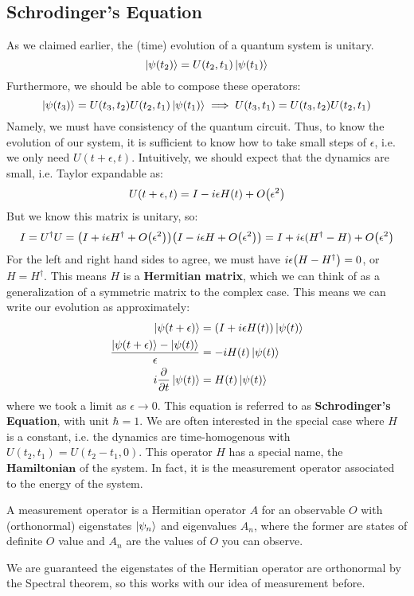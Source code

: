\subsection{Schrodinger's Equation}
As we claimed earlier, the (time) evolution of a quantum system is unitary.
\[ \ket{\psi(t_2)} = U(t_2, t_1) \ket{\psi(t_1)} \]
Furthermore, we should be able to compose these operators:
\[ \ket{\psi(t_3)} = U(t_3, t_2) U(t_2, t_1) \ket{\psi(t_1)} \implies U(t_3, t_1) = U(t_3, t_2) U(t_2, t_1) \]
Namely, we must have consistency of the quantum circuit. Thus, to know the evolution of our system, it is sufficient to know
how to take small steps of $\epsilon$, i.e. we only need $U(t + \epsilon, t)$. Intuitively, we should expect that the dynamics are small, i.e.
Taylor expandable as:
\[ U(t + \epsilon, t) = I - i\epsilon H(t) + O\qty(\epsilon^2) \]
But we know this matrix is unitary, so:
\[ I = U^{\dagger} U = \qty(I + i\epsilon H^{\dagger} + O\qty(\epsilon^2))\qty(I - i \epsilon H + O\qty(\epsilon^2)) = I + i \epsilon (H^{\dagger} - H) + O\qty(\epsilon^2) \]
For the left and right hand sides to agree, we must have $ i \epsilon \qty(H - H^{\dagger}) = 0$, or $H = H^{\dagger}$. This means $H$ is a \textbf{Hermitian matrix}, which
we can think of as a generalization of a symmetric matrix to the complex case. This means we can write our evolution as approximately:
\begin{align*}
    \ket{\psi(t + \epsilon)} &= (I + i\epsilon H(t)) \ket{\psi(t)} \\
    \frac{\ket{\psi(t + \epsilon)} - \ket{\psi(t)}}{\epsilon} &= - i H(t) \ket{\psi(t)} \\
    i \pdv{}{t} \ket{\psi(t)} &= H(t) \ket{\psi(t)}
\end{align*}
where we took a limit as $\epsilon \to 0$. This equation is referred to as \textbf{Schrodinger's Equation}, with unit $\hbar = 1$. We are often
interested in the special case where $H$ is a constant, i.e. the dynamics are time-homogenous with $U(t_2, t_1) = U(t_2 - t_1, 0)$.
This operator $H$ has a special name, the $\textbf{Hamiltonian}$ of the system. In fact, it is the measurement operator associated to the energy of the system.
\begin{definition}
    A measurement operator is a Hermitian operator $A$ for an observable $O$ %
    with (orthonormal) eigenstates $\ket{\psi_n}$ and eigenvalues $A_n$, where the former are states of definite $O$ value and $A_n$ are the values
    of $O$ you can observe.
\end{definition}
We are guaranteed the eigenstates of the Hermitian operator are orthonormal by the Spectral theorem, so this works with our idea of measurement before.
